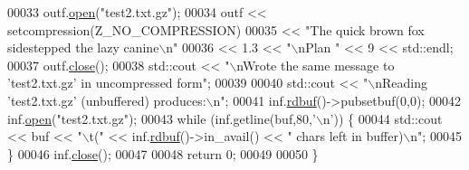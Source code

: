 \begin{DoxyCode}
00033   outf.\hyperlink{classgzofstream_aee3eb31f07eda7f5ad1f60d59ea4b239}{open}(\textcolor{stringliteral}{"test2.txt.gz"});
00034   outf << setcompression(Z\_NO\_COMPRESSION)
00035        << \textcolor{stringliteral}{"The quick brown fox sidestepped the lazy canine\(\backslash\)n"}
00036        << 1.3 << \textcolor{stringliteral}{"\(\backslash\)nPlan "} << 9 << std::endl;
00037   outf.\hyperlink{classgzofstream_a59e8b01e1c9741085f18ca456c4b8f54}{close}();
00038   std::cout << \textcolor{stringliteral}{"\(\backslash\)nWrote the same message to 'test2.txt.gz' in uncompressed form"};
00039 
00040   std::cout << \textcolor{stringliteral}{"\(\backslash\)nReading 'test2.txt.gz' (unbuffered) produces:\(\backslash\)n"};
00041   inf.\hyperlink{classgzifstream_a1c5a0ab4f99f8d8e3406af7bfd82b133}{rdbuf}()->pubsetbuf(0,0);
00042   inf.\hyperlink{classgzifstream_a8105f9300d36dafbe8b10c204583f5a1}{open}(\textcolor{stringliteral}{"test2.txt.gz"});
00043   \textcolor{keywordflow}{while} (inf.getline(buf,80,\textcolor{charliteral}{'\(\backslash\)n'})) \{
00044     std::cout << buf << \textcolor{stringliteral}{"\(\backslash\)t("} << inf.\hyperlink{classgzifstream_a1c5a0ab4f99f8d8e3406af7bfd82b133}{rdbuf}()->in\_avail() << \textcolor{stringliteral}{" chars left in buffer)\(\backslash\)n"};
00045   \}
00046   inf.\hyperlink{classgzifstream_a073fadd9dc90195c47a6ae2d863c8ace}{close}();
00047 
00048   \textcolor{keywordflow}{return} 0;
00049 
00050 \}
\end{DoxyCode}
